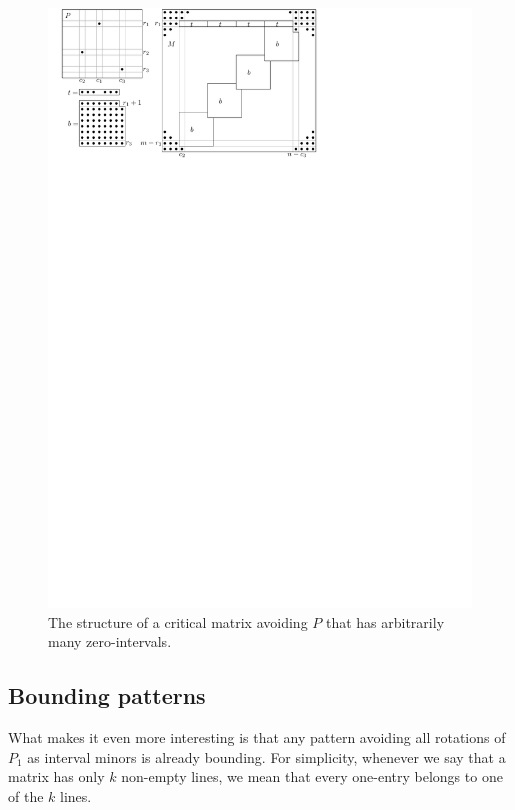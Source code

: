 \begin{figure}[!ht]
\centering
\includegraphics[width=120mm]{img/manyints.pdf}
\caption{The structure of a critical matrix avoiding $P$ that has arbitrarily many zero-intervals.}
\label{fig:manyints}
\end{figure}

\subsection{Bounding patterns}
\label{subsec:bound}
What makes it even more interesting is that any pattern avoiding all rotations of $P_1$ as interval minors is already bounding. For simplicity, whenever we say that a matrix has only $k$ non-empty lines, we mean that every one-entry belongs to one of the $k$ lines.

